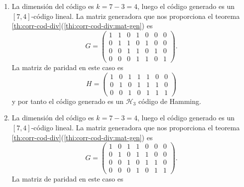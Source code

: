 \begin{example}
\begin{enumerate}
\[\begin{array}{rrrrrrr}
        0 & 1 & 1 & 0 & 0 & 0 & 0 \\
        0 & 0 & 1 & 1 & 0 & 0 & 0 \\
        0 & 0 & 0 & 1 & 1 & 0 & 0 \\
        0 & 0 & 0 & 0 & 1 & 1 & 0 \\
        0 & 0 & 0 & 0 & 0 & 1 & 1
        \end{array}\right).
    \]
    Comprobamos que la matriz de paridad es \[
      H = \left(\begin{array}{rrrrrrr}
        1 & 1 & 1 & 1 & 1 & 1 & 1
        \end{array}\right)
    \]
    y por tanto el código obtenido es un código de control de paridad.
    \item La dimensión del código es \(k = 7 - 3 = 4\), luego el código generado es un \([7, 4]\)-código lineal.
    La matriz generadora que nos proporciona el teorema \ref{th:corr-cod-div}(\ref{thi:corr-cod-div:mat-gen}) es \[
      G = \left(\begin{array}{rrrrrrr}
        1 & 1 & 0 & 1 & 0 & 0 & 0 \\
        0 & 1 & 1 & 0 & 1 & 0 & 0 \\
        0 & 0 & 1 & 1 & 0 & 1 & 0 \\
        0 & 0 & 0 & 1 & 1 & 0 & 1
        \end{array}\right).
    \]
    La matriz de paridad en este caso es \[
      H = \left(\begin{array}{rrrrrrr}
        1 & 0 & 1 & 1 & 1 & 0 & 0 \\
        0 & 1 & 0 & 1 & 1 & 1 & 0 \\
        0 & 0 & 1 & 0 & 1 & 1 & 1
        \end{array}\right)
    \]
    y por tanto el código generado es un \(\mathcal H_3\) código de Hamming.
    \item La dimensión del código es \(k = 7 - 3 = 4\), luego el código generado es un \([7, 4]\)-código lineal.
    La matriz generadora que nos proporciona el teorema \ref{th:corr-cod-div}(\ref{thi:corr-cod-div:mat-gen}) es \[
      G = \left(\begin{array}{rrrrrrr}
        1 & 0 & 1 & 1 & 0 & 0 & 0 \\
        0 & 1 & 0 & 1 & 1 & 0 & 0 \\
        0 & 0 & 1 & 0 & 1 & 1 & 0 \\
        0 & 0 & 0 & 1 & 0 & 1 & 1
        \end{array}\right).
    \]
    La matriz de paridad en este caso es \[
\]
\end{enumerate}
\end{example}
